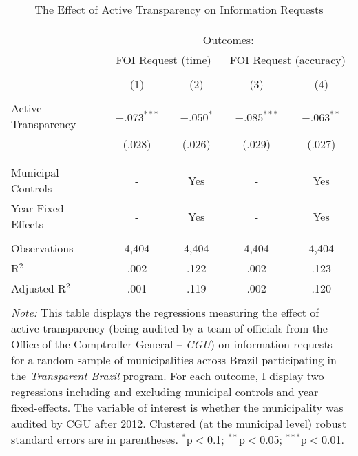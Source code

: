 
\begin{table}[!htbp] \centering
  \caption{The Effect of Active Transparency on Information Requests}
  \label{tab:transparency2}
\scriptsize
\begin{tabular}{@{\extracolsep{5pt}}lcccc}
\\[-1.8ex]\hline
\hline \\[-1.8ex]
& \multicolumn{4}{c}{Outcomes:} \T \B \\
\cline{2-5}
 & \multicolumn{2}{c}{FOI Request (time)} & \multicolumn{2}{c}{FOI Request (accuracy)} \T \B \\
\\[-1.8ex] & \multicolumn{1}{c}{(1)} & \multicolumn{1}{c}{(2)} & \multicolumn{1}{c}{(3)} & \multicolumn{1}{c}{(4)} \B \\
\hline \\[-1.8ex]
 Active Transparency & $-.073^{***}$ & $-.050^{*}$ & $-.085^{***}$ & $-.063^{**}$ \\
                     & (.028) & (.026) & (.029) & (.027) \\
                     & & & & \\
\hline \\[-1.8ex]
Municipal Controls & \multicolumn{1}{c}{-} & \multicolumn{1}{c}{Yes} & \multicolumn{1}{c}{-} & \multicolumn{1}{c}{Yes} \\
Year Fixed-Effects & \multicolumn{1}{c}{-} & \multicolumn{1}{c}{Yes} & \multicolumn{1}{c}{-} & \multicolumn{1}{c}{Yes} \\
\hline \\[-1.8ex]
Observations & \multicolumn{1}{c}{4,404} & \multicolumn{1}{c}{4,404} & \multicolumn{1}{c}{4,404} & \multicolumn{1}{c}{4,404} \\
R$^{2}$ & \multicolumn{1}{c}{.002} & \multicolumn{1}{c}{.122} & \multicolumn{1}{c}{.002} & \multicolumn{1}{c}{.123} \\
Adjusted R$^{2}$ & \multicolumn{1}{c}{.001} & \multicolumn{1}{c}{.119} & \multicolumn{1}{c}{.002} & \multicolumn{1}{c}{.120} \\
\hline
\hline \\[-1.8ex]
\multicolumn{5}{p{.6\textwidth}}{\emph{Note:} This table displays the regressions measuring the effect of active transparency (being audited by a team of officials from the Office of the Comptroller-General -- \emph{CGU}) on information requests for a random sample of municipalities across Brazil participating in the \emph{Transparent Brazil} program. For each outcome, I display two regressions including and excluding municipal controls and year fixed-effects. The variable of interest is whether the municipality was audited by CGU after 2012. Clustered (at the municipal level) robust standard errors are in parentheses. $^{*}$p$<$0.1; $^{**}$p$<$0.05; $^{***}$p$<$0.01.}\\
\end{tabular}
\end{table}
